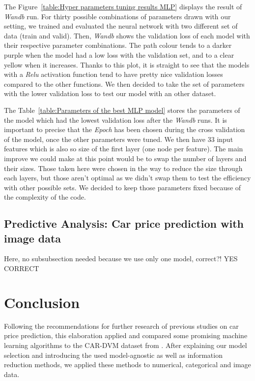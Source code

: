 \documentclass[12pt]{article}
\begin{document}
\noindent The Figure~\ref{table:Hyper parameters tuning results MLP} displays the result of \textit{Wandb} run. For thirty possible combinations of parameters drawn with our setting, we trained and evaluated the neural network with two different set of data (train and valid). Then, \textit{Wandb} shows the validation loss of each model with their respective parameter combinations. The path colour tends to a darker purple when the model had a low loss with the validation set, and to a clear yellow when it increases.
Thanks to this plot, it is straight to see that the models with a \textit{Relu} activation function tend to have pretty nice validation losses compared to the other functions.
We then decided to take the set of parameters with the lower validation loss to test our model with an other dataset. 






\noindent The Table~\ref{table:Parameters of the best MLP model} stores the parameters of the model which had the lowest validation loss after the \textit{Wandb} runs. It is important to precise that the \textit{Epoch} has been chosen during the cross validation of the model, once the other parameters were tuned. We then have 33 input features which is also so size of the first layer (one node per feature). The main improve we could make at this point would be to swap the number of layers and their sizes. Those taken here were chosen in the way to reduce the size through each layers, but those aren't optimal as we didn't swap them to test the efficiency with other possible sets. We decided to keep those parameters fixed because of the complexity of the code. 



\subsection{Predictive Analysis: Car price prediction with image data}
\noindent Here, no subsubsection needed because we use only one model, correct?! YES CORRECT



\section{Conclusion}
Following the recommendations for further research of previous studies on car price prediction, this elaboration applied and compared some promising machine learning algorithms to the CAR-DVM dataset from \cite{chen2017comparative}. After explaining our model selection and introducing the used model-agnostic as well as information reduction methods, we applied these methods to numerical, categorical and image data. 
\end{document}
